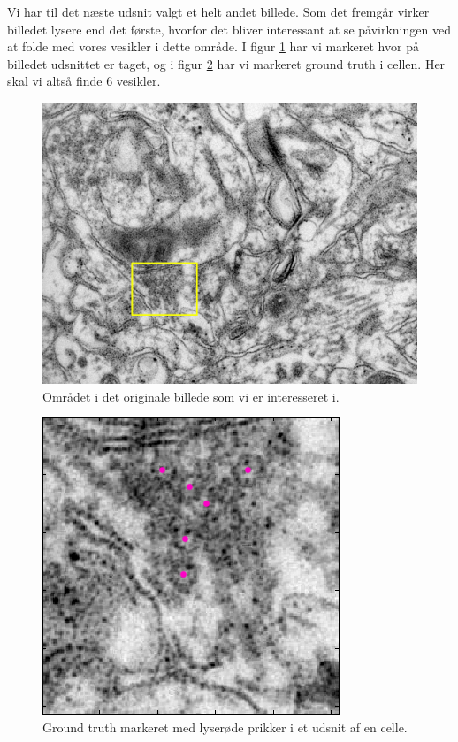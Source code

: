 Vi har til det næste udsnit valgt et helt andet billede. Som det fremgår virker billedet lysere end det første, hvorfor det bliver interessant at se påvirkningen ved at folde med vores vesikler i dette område. I figur \ref{fig:postmethod_conv_area2} har vi markeret hvor på billedet udsnittet er taget, og i figur \ref{fig:postmethod_conv_gt2} har vi markeret ground truth i cellen. Her skal vi altså finde 6 vesikler.

\begin{figure}[H]
		\centering
		\includegraphics[scale=0.5]{files/postmethod/img/area_2.png}
	\caption{Området i det originale billede som vi er interesseret i.\label{fig:postmethod_conv_area2}}
\end{figure}

\begin{figure}[H]
		\centering
		\includegraphics[scale=0.65]{files/postmethod/img/ground_truth2.png}
	\caption{Ground truth markeret med lyserøde prikker i et udsnit af en celle.\label{fig:postmethod_conv_gt2}}
\end{figure}

